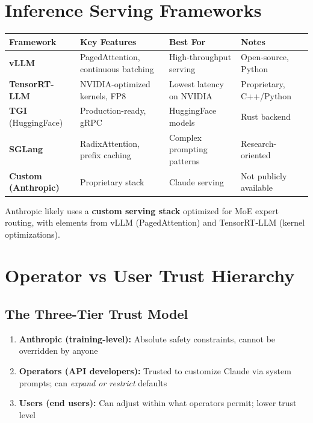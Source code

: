 \documentclass[11pt,a4paper]{article}
\begin{document}
\section{Inference Serving Frameworks}

\begin{center}
\begin{tabular}{lL{3cm}L{3cm}L{4cm}}
\toprule
\textbf{Framework} & \textbf{Key Features} & \textbf{Best For} & \textbf{Notes} \\
\midrule
\textbf{vLLM} & PagedAttention, continuous batching & High-throughput serving & Open-source, Python \\
\textbf{TensorRT-LLM} & NVIDIA-optimized kernels, FP8 & Lowest latency on NVIDIA & Proprietary, C++/Python \\
\textbf{TGI} (HuggingFace) & Production-ready, gRPC & HuggingFace models & Rust backend \\
\textbf{SGLang} & RadixAttention, prefix caching & Complex prompting patterns & Research-oriented \\
\textbf{Custom (Anthropic)} & Proprietary stack & Claude serving & Not publicly available \\
\bottomrule
\end{tabular}
\end{center}

Anthropic likely uses a \textbf{custom serving stack} optimized for MoE expert routing, with elements from vLLM (PagedAttention) and TensorRT-LLM (kernel optimizations).

\section{Operator vs User Trust Hierarchy}

\subsection{The Three-Tier Trust Model}

\begin{tcolorbox}[colback=blue!3, colframe=blue!60!black, title={\bfseries Claude's Trust Hierarchy (Highest $\to$ Lowest)}]
\begin{enumerate}[itemsep=2pt]
  \item \textbf{Anthropic (training-level):} Absolute safety constraints, cannot be overridden by anyone
  \item \textbf{Operators (API developers):} Trusted to customize Claude via system prompts; can \textit{expand or restrict} defaults
  \item \textbf{Users (end users):} Can adjust within what operators permit; lower trust level
\end{enumerate}
\end{tcolorbox}
\end{document}
